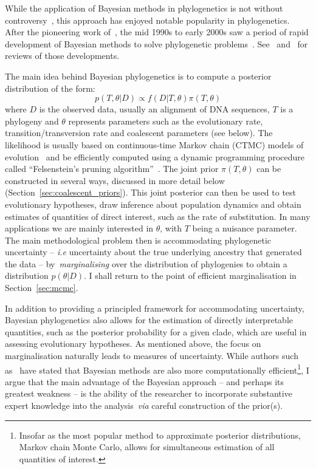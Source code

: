 While the application of Bayesian methods in phylogenetics is not without controversy~\citep{Barker2015}, this approach has enjoyed notable popularity in phylogenetics.
After the pioneering work of~\cite{Kuhner1995}, the mid 1990s to early 2000s saw a period of rapid development of Bayesian methods to solve phylogenetic problems~\citep{Rannala1996,Mau1997,Yang1997,Kuhner1998,Larget1999,Li2000,Suchard2001,Drummond2002}.
See~\cite{Huelsenbeck2001b} and~\cite{Holder2003} for reviews of those developments.

The main idea behind Bayesian phylogenetics is to compute a posterior distribution of the form:
\begin{equation}
 \label{eq:phylo_post_simple}
 p(T, \theta | D) \propto f(D| T, \theta)\pi(T, \theta)
\end{equation}
where $D$ is the observed data, usually an alignment of DNA sequences, $T$ is a phylogeny and $\theta$ represents parameters such as the evolutionary rate, transition/transversion rate and coalescent parameters (see below).
The likelihood is usually based on continuous-time Markov chain (CTMC) models of evolution~\citep{Hasegawa1985,Tavare1986} and be efficiently computed using a dynamic programming  procedure called ``Felsenstein's pruning algorithm''~\citep{Felsenstein1981}.
The joint prior $\pi(T, \theta)$ can be constructed in several ways, discussed in more detail below (Section~\ref{sec:coalescent_priors}).
This joint posterior can then be used to test evolutionary hypotheses, draw inference about population dynamics and obtain estimates of quantities of direct interest, such as the rate of substitution.
In many applications we are mainly interested in $\theta$, with $T$ being a nuisance parameter.
The main methodological  problem then is accommodating phylogenetic uncertainty -- \textit{i.e} uncertainty about the true underlying ancestry that generated the data -- by~\textit{marginalising} over the distribution of phylogenies to obtain a distribution $p(\theta | D)$.
I shall return to the point of efficient marginalisation in Section~\ref{sec:mcmc}.

In addition to providing a principled framework for accommodating uncertainty, Bayesian phylogenetics also allows for the estimation of directly interpretable  quantities, such as the posterior probability for a given clade, which are useful in assessing evolutionary hypotheses.
As mentioned above, the focus on marginalisation naturally leads to measures of uncertainty.
While authors such as~\cite{Huelsenbeck2002} have stated that Bayesian methods are also more computationally efficient\footnote{Insofar as the most popular method to approximate posterior distributions, Markov chain Monte Carlo, allows for simultaneous estimation of all quantities of interest.}, I argue that the main advantage of the Bayesian approach -- and perhaps its greatest weakness -- is the ability of the researcher to incorporate substantive expert knowledge into the analysis~\textit{via} careful construction of the prior(s).


